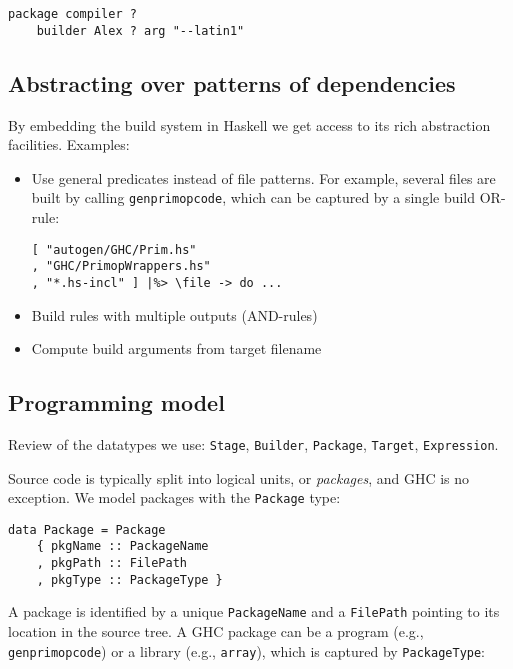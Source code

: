 \begin{verbatim}
package compiler ?
    builder Alex ? arg "--latin1"
\end{verbatim}



\subsection{Abstracting over patterns of dependencies}


By embedding the build system in Haskell we get access to its rich abstraction
facilities. Examples:
\begin{itemize}
  \item Use general predicates instead of file patterns. For example, several
  files are built by calling \texttt{genprimopcode}, which can be captured by a
  single build OR-rule:
  
\begin{lstlisting}[basicstyle=\ttfamily]
[ "autogen/GHC/Prim.hs"
, "GHC/PrimopWrappers.hs"
, "*.hs-incl" ] |%> \file -> do ...
\end{lstlisting}
  
  \item Build rules with multiple outputs (AND-rules)
  \item Compute build arguments from target filename
\end{itemize}

\subsection{Programming model}

Review of the datatypes we use: \texttt{Stage}, \texttt{Builder}, 
\texttt{Package}, \texttt{Target}, \texttt{Expression}.


Source code is typically split into logical units, or \emph{packages},
and GHC is no exception. We model packages with the \texttt{Package}
type:

\begin{lstlisting}[basicstyle=\ttfamily]
data Package = Package
    { pkgName :: PackageName
    , pkgPath :: FilePath
    , pkgType :: PackageType }
\end{lstlisting}

A package is identified by a unique \texttt{PackageName} and a
\texttt{FilePath} pointing to its location in the source tree. A GHC package can
be a program (e.g., \texttt{genprimopcode}) or a library (e.g., \texttt{array}), which is
captured by \texttt{PackageType}:

